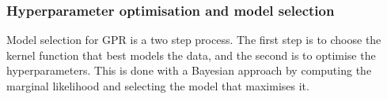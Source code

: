 


\subsubsection{Hyperparameter optimisation and model selection}

Model selection for GPR is a two step process. The first step is to choose the kernel function that best models the data, and the second is to optimise the hyperparameters. This is done with a Bayesian approach by computing the marginal likelihood and selecting the model that maximises it. 




